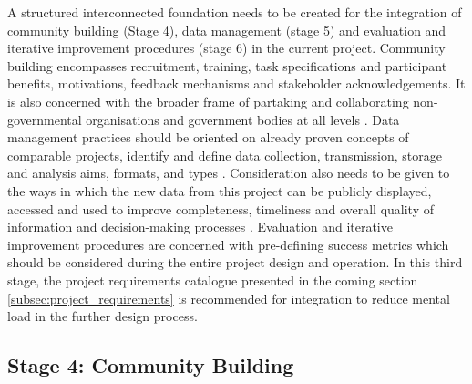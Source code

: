 A structured interconnected foundation needs to be created for the integration of community building (Stage 4), data management (stage 5) and evaluation and iterative improvement procedures (stage 6) in the current project. Community building encompasses recruitment, training, task specifications and participant benefits, motivations, feedback mechanisms and stakeholder acknowledgements. It is also concerned with the broader frame of partaking and collaborating non-governmental organisations and government bodies at all levels \autocite{conradReviewCitizenScience2011}. Data management practices should be oriented on already proven concepts of comparable projects, identify and define data collection, transmission, storage and analysis aims, formats, and types \autocite{fraislCitizenScienceEnvironmental2022,gualazziniEWEAEarlyWarning2021,ifrcCommunityBasedSurveillanceGuiding2017}. Consideration also needs to be given to the ways in which the new data from this project can be publicly displayed, accessed and used to improve completeness, timeliness and overall quality of information and decision-making processes \autocite{conradMeaningfulCommunityBasedEcological2006}. Evaluation and iterative improvement procedures are concerned with pre-defining success metrics which should be considered during the entire project design and operation.\newline
In this third stage, the project requirements catalogue presented in the coming section \ref*{subsec:project_requirements} is recommended for integration to reduce mental load in the further design process.

\subsection{Stage 4: Community Building}

